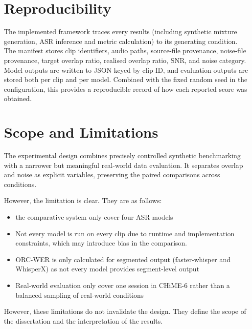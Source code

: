 \section{Reproducibility}
The implemented framework traces every results (including synthetic mixture generation, ASR inference and metric calculation) to its generating condition. The manifest stores clip identifiers, audio paths, source-file provenance, noise-file provenance, target overlap ratio, realised overlap ratio, SNR, and noise category. Model outputs are written to JSON keyed by clip ID, and evaluation outputs are stored both per clip and per model. Combined with the fixed random seed in the configuration, this provides a reproducible record of how each reported score was obtained.

\section{Scope and Limitations}
The experimental design combines precisely controlled synthetic benchmarking with a narrower but meaningful real-world data evaluation. It separates overlap and noise as explicit variables, preserving the paired comparisons across conditions.

However, the limitation is clear. They are as follows: 
\begin{itemize}
    \item the comparative system only cover four ASR models
    \item Not every model is run on every clip due to runtime and implementation constraints, which may introduce bias in the comparison.
    \item ORC-WER is only calculated for segmented output (faster-whisper and WhisperX) as not every model provides segment-level output
    \item Real-world evaluation only cover one session in CHiME-6 rather than a balanced sampling of real-world conditions
\end{itemize}
However, these limitations do not invalidate the design. They define the scope of the dissertation and the interpretation of the results.
